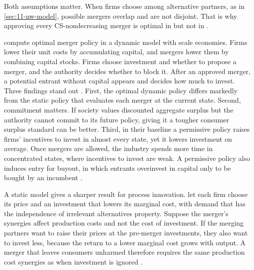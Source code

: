 Both assumptions matter. When firms choose among alternative partners, as in \cref{sec:11-nw-model}, possible mergers
overlap and are not disjoint. That is why approving every CS-nondecreasing merger is optimal in
\citet{NockeWhinston2010} but not in \citet{NockeWhinston2013} \citep[p.~234, n.~141]{AskerNocke2021}.

\citet{MermelsteinEtAl2020} compute optimal merger policy in a dynamic model with scale economies. Firms lower their
unit costs by accumulating capital, and mergers lower them by combining capital stocks. Firms choose investment and
whether to propose a merger, and the authority decides whether to block it. After an approved merger, a potential
entrant without capital appears and decides how much to invest. Three findings stand out \citep[pp.~235--236]{AskerNocke2021}.
First, the optimal dynamic policy differs markedly from the static policy that evaluates each merger at the current
state. Second, commitment matters. If society values discounted aggregate surplus but the authority cannot commit to
its future policy, giving it a tougher consumer surplus standard can be better. Third, in their baseline a permissive
policy raises firms' incentives to invest in almost every state, yet it lowers investment on average. Once mergers are
allowed, the industry spends more time in concentrated states, where incentives to invest are weak. A permissive policy
also induces entry for buyout, in which entrants overinvest in capital only to be bought by an incumbent
\citep{Rasmusen1988}.

A static model gives a sharper result for process innovation. \citet{MottaTarantino2019} let each firm choose its price
and an investment that lowers its marginal cost, with demand that has the independence of irrelevant alternatives
property. Suppose the merger's synergies affect production costs and not the cost of investment. If the merging
partners want to raise their prices at the pre-merger investments, they also want to invest less, because the return to
a lower marginal cost grows with output. A merger that leaves consumers unharmed therefore requires the same production
cost synergies as when investment is ignored \citep[pp.~234--235]{AskerNocke2021}.

